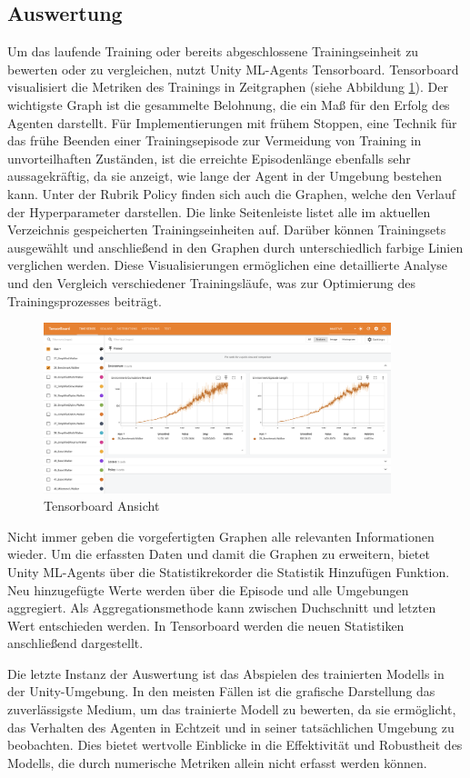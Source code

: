 \subsection{Auswertung}
Um das laufende Training oder bereits abgeschlossene Trainingseinheit zu bewerten oder zu vergleichen, nutzt Unity ML-Agents Tensorboard. Tensorboard visualisiert die Metriken des Trainings in Zeitgraphen (siehe Abbildung \ref{fig:tensorboard}). Der wichtigste Graph ist die gesammelte Belohnung, die ein Maß für den Erfolg des Agenten darstellt. Für Implementierungen mit frühem Stoppen, eine Technik für das frühe Beenden einer Trainingsepisode zur Vermeidung von Training in unvorteilhaften Zuständen, ist die erreichte Episodenlänge ebenfalls sehr aussagekräftig, da sie anzeigt, wie lange der Agent in der Umgebung bestehen kann. Unter der Rubrik \grqq{}Policy\grqq{} finden sich auch die Graphen, welche den Verlauf der Hyperparameter darstellen. Die linke Seitenleiste listet alle im aktuellen Verzeichnis gespeicherten Trainingseinheiten auf. Darüber können Trainingsets ausgewählt und anschließend in den Graphen durch unterschiedlich farbige Linien verglichen werden. Diese Visualisierungen ermöglichen eine detaillierte Analyse und den Vergleich verschiedener Trainingsläufe, was zur Optimierung des Trainingsprozesses beiträgt.

\begin{figure}[H]
  \centering  
  \includegraphics[width=0.9\textwidth]{img/tensorboard}
  \caption{Tensorboard Ansicht}
  \label{fig:tensorboard}
\end{figure}

Nicht immer geben die vorgefertigten Graphen alle relevanten Informationen wieder. Um die erfassten Daten und damit die Graphen zu erweitern, bietet Unity ML-Agents über die Statistikrekorder die \grqq{}Statistik Hinzufügen\grqq{} Funktion. Neu hinzugefügte Werte werden über die Episode und alle Umgebungen aggregiert. Als Aggregationsmethode kann zwischen Duchschnitt und letzten Wert entschieden werden. In Tensorboard werden die neuen Statistiken anschließend dargestellt.

Die letzte Instanz der Auswertung ist das Abspielen des trainierten Modells in der Unity-Umgebung. In den meisten Fällen ist die grafische Darstellung das zuverlässigste Medium, um das trainierte Modell zu bewerten, da sie ermöglicht, das Verhalten des Agenten in Echtzeit und in seiner tatsächlichen Umgebung zu beobachten. Dies bietet wertvolle Einblicke in die Effektivität und Robustheit des Modells, die durch numerische Metriken allein nicht erfasst werden können.